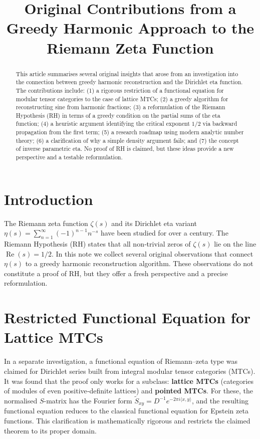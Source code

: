 \documentclass[12pt,a4paper]{article}
\title{Original Contributions from a Greedy Harmonic Approach to the Riemann Zeta Function}
\author{}
\date{}
\begin{document}
\maketitle

\begin{abstract}
This article summarises several original insights that arose from an investigation into the connection between greedy harmonic reconstruction and the Dirichlet eta function. The contributions include: (1) a rigorous restriction of a functional equation for modular tensor categories to the case of lattice MTCs; (2) a greedy algorithm for reconstructing sine from harmonic fractions; (3) a reformulation of the Riemann Hypothesis (RH) in terms of a greedy condition on the partial sums of the eta function; (4) a heuristic argument identifying the critical exponent $1/2$ via backward propagation from the first term; (5) a research roadmap using modern analytic number theory; (6) a clarification of why a simple density argument fails; and (7) the concept of inverse parametric eta. No proof of RH is claimed, but these ideas provide a new perspective and a testable reformulation.
\end{abstract}

\section{Introduction}

The Riemann zeta function $\zeta(s)$ and its Dirichlet eta variant $\eta(s)=\sum_{n=1}^\infty (-1)^{n-1}n^{-s}$ have been studied for over a century. The Riemann Hypothesis (RH) states that all non‑trivial zeros of $\zeta(s)$ lie on the line $\operatorname{Re}(s)=1/2$. In this note we collect several original observations that connect $\eta(s)$ to a greedy harmonic reconstruction algorithm. These observations do not constitute a proof of RH, but they offer a fresh perspective and a precise reformulation.

\section{Restricted Functional Equation for Lattice MTCs}

In a separate investigation, a functional equation of Riemann–zeta type was claimed for Dirichlet series built from integral modular tensor categories (MTCs). It was found that the proof only works for a subclass: \textbf{lattice MTCs} (categories of modules of even positive‑definite lattices) and \textbf{pointed MTCs}. For these, the normalised $S$-matrix has the Fourier form $\tilde S_{xy}=D^{-1}e^{-2\pi i\langle x,y\rangle}$, and the resulting functional equation reduces to the classical functional equation for Epstein zeta functions. This clarification is mathematically rigorous and restricts the claimed theorem to its proper domain.
\end{document}
